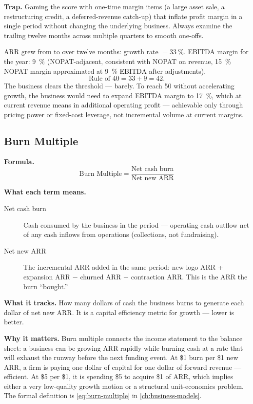 \textbf{Trap.} Gaming the score with one-time margin items (a large asset sale, a
restructuring credit, a deferred-revenue catch-up) that inflate profit margin in a single
period without changing the underlying business. Always examine the trailing twelve months
across multiple quarters to smooth one-offs.

\begin{example}
ARR grew from  to  over twelve months: growth rate
$= \qty{33}{\percent}$. EBITDA margin for the year: \qty{9}{\percent} (NOPAT-adjacent,
consistent with  NOPAT on  revenue, \qty{15}{\percent}
NOPAT margin approximated at \qty{9}{\percent} EBITDA after adjustments).
\[
  \text{Rule of 40} = 33 + 9 = 42.
\]
The business clears the threshold --- barely. To reach 50 without accelerating growth, the
business would need to expand EBITDA margin to \qty{17}{\percent}, which at current revenue
means  in additional operating profit --- achievable only through pricing power
or fixed-cost leverage, not incremental volume at current margins.
\end{example}


\subsection{Burn Multiple}

\textbf{Formula.}
\[
  \text{Burn Multiple} = \frac{\text{Net cash burn}}{\text{Net new ARR}}
\]

\textbf{What each term means.}
\begin{description}
  \item[Net cash burn] Cash consumed by the business in the period --- operating cash outflow
    net of any cash inflows from operations (collections, not fundraising).
  \item[Net new ARR] The incremental ARR added in the same period: new logo ARR + expansion
    ARR $-$ churned ARR $-$ contraction ARR. This is the ARR the burn ``bought.''
\end{description}

\textbf{What it tracks.} How many dollars of cash the business burns to generate each dollar
of net new ARR. It is a capital efficiency metric for growth --- lower is better.

\textbf{Why it matters.} Burn multiple connects the income statement to the balance sheet:
a business can be growing ARR rapidly while burning cash at a rate that will exhaust the
runway before the next funding event. At \$1 burn per \$1 new ARR, a firm is paying one
dollar of capital for one dollar of forward revenue --- efficient. At \$5 per \$1, it is
spending \$5 to acquire \$1 of ARR, which implies either a very low-quality growth motion
or a structural unit-economics problem. The formal definition is \cref{eq:burn-multiple} in
\cref{ch:business-models}.

